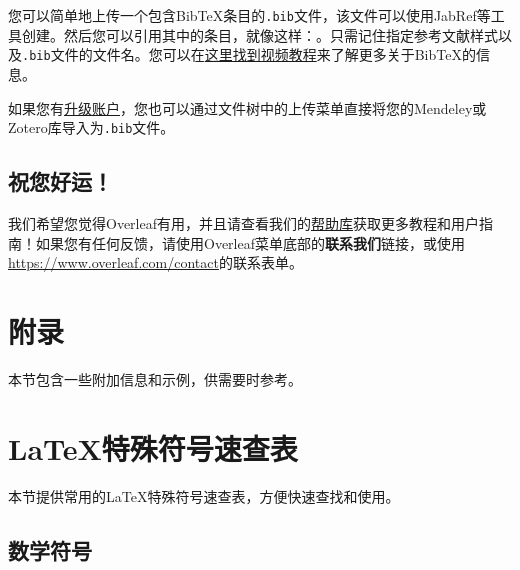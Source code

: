 \documentclass{article}
\begin{document}
您可以简单地上传一个包含BibTeX条目的\verb|.bib|文件，该文件可以使用JabRef等工具创建。然后您可以引用其中的条目，就像这样：\cite{greenwade93}。只需记住指定参考文献样式以及\verb|.bib|文件的文件名。您可以在\href{https://www.overleaf.com/help/97-how-to-include-a-bibliography-using-bibtex}{这里找到视频教程}来了解更多关于BibTeX的信息。

如果您有\href{https://www.overleaf.com/user/subscription/plans}{升级账户}，您也可以通过文件树中的上传菜单直接将您的Mendeley或Zotero库导入为\verb|.bib|文件。

\subsection{祝您好运！}

我们希望您觉得Overleaf有用，并且请查看我们的\href{https://www.overleaf.com/learn}{帮助库}获取更多教程和用户指南！如果您有任何反馈，请使用Overleaf菜单底部的\textbf{联系我们}链接，或使用\url{https://www.overleaf.com/contact}的联系表单。



\appendix
\section{附录}
本节包含一些附加信息和示例，供需要时参考。

\section{LaTeX特殊符号速查表}

本节提供常用的LaTeX特殊符号速查表，方便快速查找和使用。

\subsection{数学符号}
\end{document}
